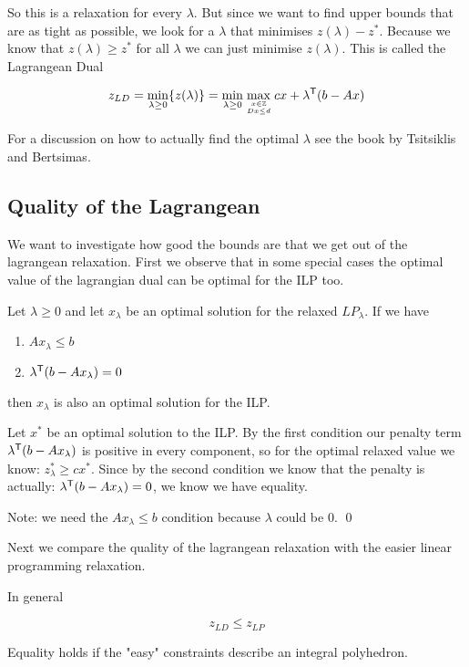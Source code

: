 So this is a relaxation for every $\lambda$. But since we want to find upper bounds that are as tight as possible, we look for a $\lambda$ that minimises $z(\lambda)-z^*$. Because we know that $z(\lambda)\geq z^*$ for all $\lambda$ we can just minimise $z(\lambda)$. This is called the Lagrangean Dual

\[z_{LD} = \min_{\lambda\geq 0} \{z(\lambda)\} = \min_{\lambda\geq 0} \max_{{x\in \mathbb{Z}}\atop {Dx\leq d}} cx+{\lambda}^\text{\upshape \sffamily T}(b-Ax) \]

For a discussion on how to actually find the optimal $\lambda$ see the book by Tsitsiklis and Bertsimas.

\subsection{Quality of the Lagrangean}

We want to investigate how good the bounds are that we get out of the lagrangean relaxation. First we observe that in some special cases the optimal value of the lagrangian dual can be optimal for the ILP too.

\begin{thm}\label{thm:relaxedOptimal} Let $\lambda \geq 0 $ and let $x_\lambda$ be an optimal solution for the relaxed $LP_\lambda$. If we have

\begin{enumerate}
\item $Ax_\lambda \leq b$
\item ${\lambda}^\text{\upshape \sffamily T}(b-Ax_\lambda) = 0$
\end{enumerate}

then $x_\lambda$ is also an optimal solution for the ILP.
\end{thm}

\begin{pr} Let $x^*$ be an optimal solution to the ILP. By the first condition our penalty term ${\lambda}^\text{\upshape \sffamily T}(b-Ax_\lambda)$ is positive in every component, so for the optimal relaxed value we know: $z_\lambda ^*\geq c x^*$. Since by the second condition we know that the penalty is actually: ${\lambda}^\text{\upshape \sffamily T}(b-Ax_\lambda) = 0$, we know we have equality.

Note: we need the $Ax_\lambda \leq b$ condition because $\lambda$ could be 0.
\qed \end{pr}

Next we compare the quality of the lagrangean relaxation with the easier linear programming relaxation.

\begin{thm} In general

\[z_{LD} \leq z_{LP}\]

Equality holds if the "easy" constraints describe an integral polyhedron.
\end{thm}

